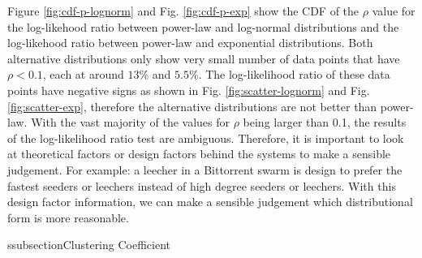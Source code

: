 \documentclass[paper]{ieice}
\begin{document}
Figure \ref{fig:cdf-p-lognorm} and Fig. \ref{fig:cdf-p-exp} show the CDF of the $\rho$ value for the log-likehood ratio between power-law and log-normal distributions and the log-likehood ratio between power-law and exponential distributions.
Both alternative distributions only show very small number of data points that have $\rho < 0.1$, each at around $13\%$ and $5.5\%$.
The log-likelihood ratio of these data points have negative signs as shown in Fig. \ref{fig:scatter-lognorm} and Fig. \ref{fig:scatter-exp}, therefore the alternative distributions are not better than power-law.
With the vast majority of the values for $\rho$ being larger than 0.1, the results of the log-likelihood ratio test are ambiguous. 
Therefore, it is important to look at theoretical factors or design factors behind the systems to make a sensible judgement.
For example: a leecher in a Bittorrent swarm is design to prefer the fastest seeders or leechers instead of high degree seeders or leechers. 
With this design factor information, we can make a sensible judgement which distributional form is more reasonable.


ssubsection{Clustering Coefficient}\label{clusteringcoef}
\end{document}
